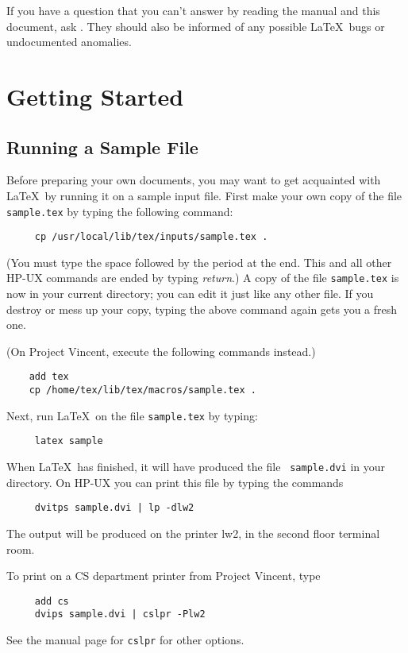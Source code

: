 If you have a question that you can't answer by reading the manual and
this document, ask \contact.  They should also be informed of any
possible \LaTeX\ bugs or undocumented anomalies.


\section{Getting Started}

\subsection{Running a Sample File} \label{sec:sample}

Before preparing your own documents, you may want to get acquainted
with \LaTeX\ by running it on a sample input file.  First make your own
copy of the file \mbox{\tt sample.tex} by typing the following
command:
\begin{verbatim}
     cp /usr/local/lib/tex/inputs/sample.tex .
\end{verbatim}
(You must type the space followed by the period at the end.  This
and all other HP-UX commands are ended by typing {\em return}.)
A copy of the file \mbox{\tt sample.tex} is now in your current
directory; you can edit it just like any other file.  If you destroy or
mess up your copy, typing the above command again gets you a fresh
one.

(On Project Vincent, execute the following commands instead.)
\begin{verbatim}
    add tex
    cp /home/tex/lib/tex/macros/sample.tex .
\end{verbatim}

Next, run \LaTeX\ on the file \mbox{\tt sample.tex} by typing:
\begin{verbatim}
     latex sample
\end{verbatim}
When \LaTeX\ has finished, it will have produced the file \mbox{\tt
sample.dvi} in your directory.  On HP-UX you can print this file
by typing the commands
\begin{verbatim}
     dvitps sample.dvi | lp -dlw2 
\end{verbatim}
The output will be produced on the printer lw2, in the second floor
terminal room.

To print on a CS department printer from Project Vincent, type
\begin{verbatim}
     add cs
     dvips sample.dvi | cslpr -Plw2
\end{verbatim}
See the manual page for {\tt cslpr} for other options.

